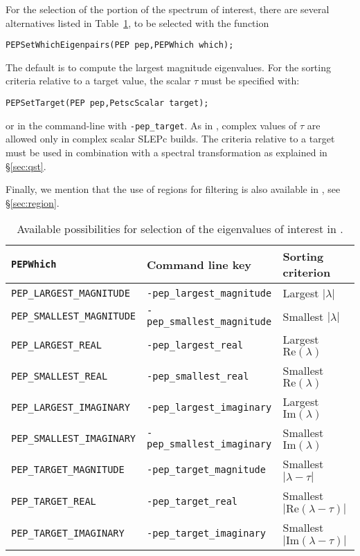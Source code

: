 For the selection of the portion of the spectrum of interest, there are several alternatives listed in Table~\ref{tab:portionq}, to be selected with the function
	\begin{Verbatim}[fontsize=\small]
	PEPSetWhichEigenpairs(PEP pep,PEPWhich which);
	\end{Verbatim}
The default is to compute the largest magnitude eigenvalues.
For the sorting criteria relative to a target value, the scalar $\tau$ must be specified with:
	\begin{Verbatim}[fontsize=\small]
	PEPSetTarget(PEP pep,PetscScalar target);
	\end{Verbatim}
or in the command-line with \Verb!-pep_target!. As in , complex values of $\tau$ are allowed only in complex scalar SLEPc builds. The criteria relative to a target must be used in combination with a spectral transformation as explained in \S\ref{sec:qst}.

Finally, we mention that the use of regions for filtering is also available in , see \S\ref{sec:region}.

\begin{table}
\centering
{\small \begin{tabular}{lll}
\texttt{PEPWhich}                  & Command line key                   & Sorting criterion \\\hline
\texttt{PEP\_LARGEST\_MAGNITUDE}   & \texttt{-pep\_largest\_magnitude}  & Largest $|\lambda|$ \\
\texttt{PEP\_SMALLEST\_MAGNITUDE}  & \texttt{-pep\_smallest\_magnitude} & Smallest $|\lambda|$ \\
\texttt{PEP\_LARGEST\_REAL}        & \texttt{-pep\_largest\_real}       & Largest $\mathrm{Re}(\lambda)$ \\
\texttt{PEP\_SMALLEST\_REAL}       & \texttt{-pep\_smallest\_real}      & Smallest $\mathrm{Re}(\lambda)$ \\
\texttt{PEP\_LARGEST\_IMAGINARY}   & \texttt{-pep\_largest\_imaginary}  & Largest $\mathrm{Im}(\lambda)$\footnotemark \\
\texttt{PEP\_SMALLEST\_IMAGINARY}  & \texttt{-pep\_smallest\_imaginary} & Smallest $\mathrm{Im}(\lambda)$\addtocounter{footnote}{-1}\footnotemark \\\hline
\texttt{PEP\_TARGET\_MAGNITUDE}    & \texttt{-pep\_target\_magnitude}   & Smallest $|\lambda-\tau|$ \\
\texttt{PEP\_TARGET\_REAL}         & \texttt{-pep\_target\_real}        & Smallest $|\mathrm{Re}(\lambda-\tau)|$ \\
\texttt{PEP\_TARGET\_IMAGINARY}    & \texttt{-pep\_target\_imaginary}   & Smallest $|\mathrm{Im}(\lambda-\tau)|$ \\\hline
\end{tabular} }
\caption{\label{tab:portionq}Available possibilities for selection of the eigenvalues of interest in .}
\end{table}

